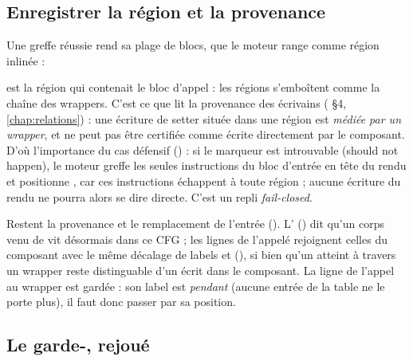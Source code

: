 \subsection{Enregistrer la région et la provenance}

Une greffe réussie rend sa plage de blocs, que le moteur range comme région inlinée :


 est la région qui contenait le bloc d'appel : les régions s'emboîtent comme la chaîne des wrappers. C'est ce que lit la provenance des écrivains ( §4, \cref{chap:relations}) : une écriture de setter située dans une région est \emph{médiée par un wrapper}, et ne peut pas être certifiée comme écrite directement par le composant. D'où l'importance du cas défensif () : si le marqueur est introuvable (\og should not happen\fg{}), le moteur greffe les seules instructions du bloc d'entrée en tête du rendu et positionne , car ces instructions échappent à toute région ; aucune écriture du rendu ne pourra alors se dire directe. C'est un repli \emph{fail-closed}.

Restent la provenance et le remplacement de l'entrée (). L' () dit qu'un corps venu de  vit désormais dans ce CFG ; les lignes  de l'appelé rejoignent celles du composant avec le même décalage de labels et  (), si bien qu'un  atteint à travers un wrapper reste distinguable d'un  écrit dans le composant. La ligne de l'appel au wrapper est gardée : son label est \emph{pendant} (aucune entrée de la table ne le porte plus), il faut donc passer par sa position.

\subsection{Le garde-\texorpdfstring{}{throw}, rejoué}

